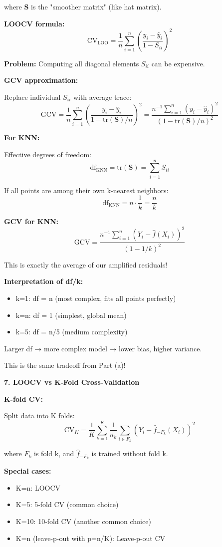 \documentclass[12pt]{article}
\begin{document}
\begin{explanation}
where $\mathbf{S}$ is the "smoother matrix" (like hat matrix).

\textbf{LOOCV formula:}
\[
\text{CV}_{\text{LOO}} = \frac{1}{n}\sum_{i=1}^n \left(\frac{y_i - \hat{y}_i}{1 - S_{ii}}\right)^2
\]

\textbf{Problem:} Computing all diagonal elements $S_{ii}$ can be expensive.

\textbf{GCV approximation:}

Replace individual $S_{ii}$ with average trace:
\[
\text{GCV} = \frac{1}{n}\sum_{i=1}^n \left(\frac{y_i - \hat{y}_i}{1 - \text{tr}(\mathbf{S})/n}\right)^2 = \frac{n^{-1}\sum_{i=1}^n (y_i - \hat{y}_i)^2}{(1 - \text{tr}(\mathbf{S})/n)^2}
\]

\textbf{For KNN:}

Effective degrees of freedom:
\[
\text{df}_{\text{KNN}} = \text{tr}(\mathbf{S}) = \sum_{i=1}^n S_{ii}
\]

If all points are among their own k-nearest neighbors:
\[
\text{df}_{\text{KNN}} = n \cdot \frac{1}{k} = \frac{n}{k}
\]

\textbf{GCV for KNN:}
\[
\text{GCV} = \frac{n^{-1}\sum_{i=1}^n (Y_i - \hat{f}(X_i))^2}{(1 - 1/k)^2}
\]

This is exactly the average of our amplified residuals!

\textbf{Interpretation of df/k:}

\begin{itemize}
    \item k=1: df = n (most complex, fits all points perfectly)
    \item k=n: df = 1 (simplest, global mean)
    \item k=5: df = n/5 (medium complexity)
\end{itemize}

Larger df → more complex model → lower bias, higher variance.

This is the same tradeoff from Part (a)!

\textbf{7. LOOCV vs K-Fold Cross-Validation}

\textbf{K-fold CV:}

Split data into K folds:
\[
\text{CV}_K = \frac{1}{K}\sum_{k=1}^K \frac{1}{n_k}\sum_{i \in F_k} (Y_i - \hat{f}_{-F_k}(X_i))^2
\]

where $F_k$ is fold k, and $\hat{f}_{-F_k}$ is trained without fold k.

\textbf{Special cases:}
\begin{itemize}
    \item K=n: LOOCV
    \item K=5: 5-fold CV (common choice)
    \item K=10: 10-fold CV (another common choice)
    \item K=n (leave-p-out with p=n/K): Leave-p-out CV
\end{itemize}


\end{explanation}
\end{document}
